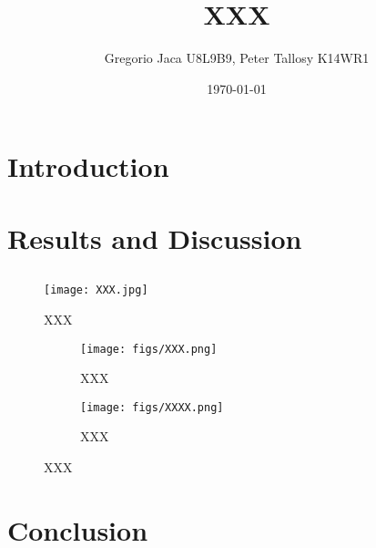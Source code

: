 \documentclass[12pt,a4paper]{article}
\title{XXX}
\author{Gregorio Jaca U8L9B9, Peter Tallosy K14WR1 }
\date{\today}
\begin{document}
\maketitle

\begin{abstract}

\end{abstract}

\section{Introduction}

\section{Results and Discussion}

\subsection{}

\begin{figure} [H]
    \centering
    \texttt{[image: XXX.jpg]}
    \caption{XXX}
    \label{fig:XXX}
\end{figure}

\begin{figure}[H]
    \centering
    \begin{subfigure}[b]{0.48\linewidth}
        \centering
        \texttt{[image: figs/XXX.png]}
        \caption{XXX}
    \end{subfigure}\hfill
    \begin{subfigure}[b]{0.48\linewidth}
        \centering
        \texttt{[image: figs/XXXX.png]}
        \caption{XXX}
    \end{subfigure}

    \caption{XXX}
    \label{fig:XXX}
\end{figure}

\section{Conclusion}
\end{document}
